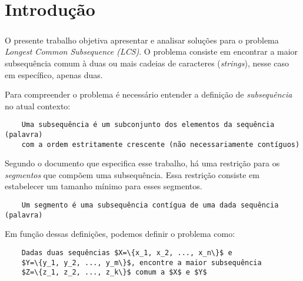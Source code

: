 \chapter{Introdução}

\paragraph*{}

O presente trabalho objetiva apresentar e analisar soluções para
o problema {\it Longest Common Subsequence (LCS)}. O problema 
consiste em encontrar a maior subsequência comum à duas ou 
mais cadeias de caracteres ({\it strings}), nesse caso em 
específico, apenas duas.

Para compreender o problema é necessário entender a definição
de \emph{ subsequência} no atual contexto:
\begin{verbatim}
    Uma subsequência é um subconjunto dos elementos da sequência (palavra)
    com a ordem estritamente crescente (não necessariamente contíguos)
\end{verbatim}

Segundo o documento que especifica esse trabalho, há uma restrição para os
\emph{segmentos} que compõem uma subsequência. Essa restrição consiste em 
estabelecer um tamanho mínimo para esses segmentos.
\begin{verbatim}
    Um segmento é uma subsequência contígua de uma dada sequência (palavra)
\end{verbatim}

Em função dessas definições, podemos definir o problema como:
\begin{verbatim}
    Dadas duas sequências $X=\{x_1, x_2, ..., x_n\}$ e 
    $Y=\{y_1, y_2, ..., y_m\}$, encontre a maior subsequência 
    $Z=\{z_1, z_2, ..., z_k\}$ comum a $X$ e $Y$
\end{verbatim}
